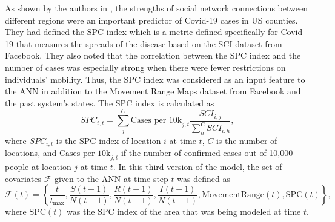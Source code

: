 As shown by the authors in \cite{kuchlerGeographicSpreadCOVID192020}, the strengths of social network connections between different regions were an important predictor of Covid-19 cases in US counties.
They had defined the \gls{SPC} index which is a metric defined specifically for Covid-19 that measures the spreads of the disease based on the \gls{SCI} dataset from Facebook.
They also noted that the correlation between the \gls{SPC} index and the number of cases was especially strong when there were fewer restrictions on individuals' mobility.
Thus, the \gls{SPC} index was considered as an input feature to the \gls{ANN} in addition to the Movement Range Maps dataset from Facebook and the past system's states.
The \gls{SPC} index is calculated as
\begin{equation*}
    SPC_{i,t} = \sum_j^C \text{Cases per 10k}_{j,t} \frac{SCI_{i,j}}{\sum_h^C SCI_{i,h}},
\end{equation*}
where $SPC_{i,t}$ is the \gls{SPC} index of location $i$ at time $t$, $C$ is the number of locations, and $\text{Cases per 10k}_{j,t}$ if the number of confirmed cases out of 10,000 people at location $j$ at time $t$.
In this third version of the model, the set of covariates $\mathcal{F}$ given to the \gls{ANN} at time step $t$ was defined as
\begin{equation*}
    \mathcal{F}(t) = \left\lbrace \frac{t}{t_\text{max}}, \frac{S(t-1)}{N(t-1)}, \frac{R(t-1)}{N(t-1)}, \frac{I(t-1)}{N(t-1)}, \text{MovementRange}(t), \text{SPC}(t) \right\rbrace,
\end{equation*}
where $\text{SPC}(t)$ was the \gls{SPC} index of the area that was being modeled at time $t$.
